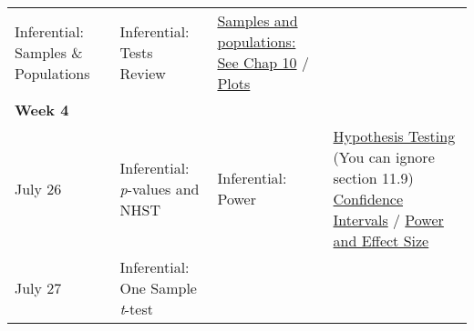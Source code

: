 \documentclass[
]{book}
\begin{document}
\begin{longtable}[]{@{}llll@{}}
\begin{minipage}[t]{0.32\columnwidth}
Inferential: Samples \& Populations\strut
\end{minipage} & \begin{minipage}[t]{0.29\columnwidth}\raggedright
Inferential: Tests Review\strut
\end{minipage} & \begin{minipage}[t]{0.18\columnwidth}\raggedright
\href{https://learningstatisticswithr.com/lsr-0.6.pdf}{Samples and populations: See Chap 10} / \href{http://tidylsr.djnavarro.net/datavis.html}{Plots}\strut
\end{minipage}\tabularnewline
\begin{minipage}[t]{0.09\columnwidth}\raggedright
\textbf{Week 4}\strut
\end{minipage} & \begin{minipage}[t]{0.32\columnwidth}\raggedright
\strut
\end{minipage} & \begin{minipage}[t]{0.29\columnwidth}\raggedright
\strut
\end{minipage} & \begin{minipage}[t]{0.18\columnwidth}\raggedright
\strut
\end{minipage}\tabularnewline
\begin{minipage}[t]{0.09\columnwidth}\raggedright
July 26\strut
\end{minipage} & \begin{minipage}[t]{0.32\columnwidth}\raggedright
Inferential: \emph{p}-values and NHST\strut
\end{minipage} & \begin{minipage}[t]{0.29\columnwidth}\raggedright
Inferential: Power\strut
\end{minipage} & \begin{minipage}[t]{0.18\columnwidth}\raggedright
\href{https://learningstatisticswithr.com/book/hypothesistesting.html}{Hypothesis Testing} (You can ignore section 11.9) \href{https://learningstatisticswithr.com/book/estimation.html\#ci}{Confidence Intervals} / \href{https://www.crumplab.com/statistics/thinking-about-answering-questions-with-data.html}{Power and Effect Size}\strut
\end{minipage}\tabularnewline
\begin{minipage}[t]{0.09\columnwidth}\raggedright
July 27\strut
\end{minipage} & \begin{minipage}[t]{0.32\columnwidth}\raggedright
Inferential: One Sample \emph{t}-test\strut
\end{minipage} & \begin{minipage}[t]{0.29\columnwidth}\raggedright

\end{minipage}
\end{longtable}
\end{document}
